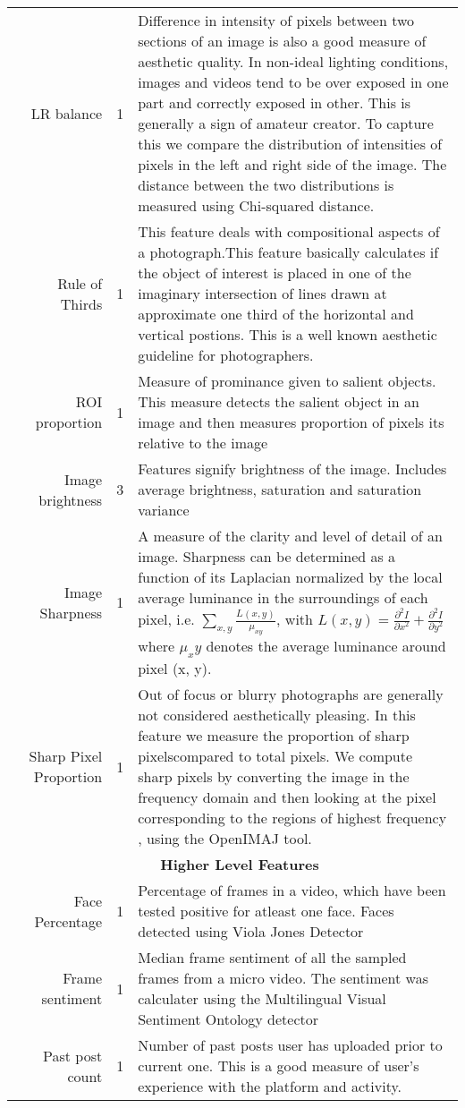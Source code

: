 \begin{table*}[t]
{\begin{tabular}{|c|r|c|p{20cm}|}
		& LR balance &1 & Difference in intensity of pixels between two sections of an image is also a good measure of aesthetic quality. In non-ideal lighting conditions, images and videos tend to be over exposed in one part and correctly exposed in other. This is generally a sign of amateur creator. To capture this we compare the distribution of intensities of pixels in the left and right side of the image. The distance between the two distributions is measured using Chi-squared distance.\\
		& Rule of Thirds & 1 & This feature deals with compositional aspects of a photograph.This feature basically calculates if the object of interest is placed in one of the imaginary intersection of lines drawn at approximate one third of the horizontal and vertical postions. This is a well known aesthetic guideline for photographers. \\
		& ROI proportion & 1 & Measure of prominance given to salient objects. This measure detects the salient object in an image and then measures proportion of pixels its relative to the image \\
		& Image brightness & 3 & Features signify brightness of the image. Includes average brightness, saturation  and saturation variance\\
		& Image Sharpness & 1 & A measure of the clarity and level of detail of an image. Sharpness can be determined as a function of its Laplacian normalized by the local average luminance in the surroundings of each pixel, i.e. $\sum_{x, y} \frac{L(x, y)}{\mu_{xy}}$, with $L(x, y) = \frac{\partial^2I}{\partial x^2}+\frac{\partial^2I}{\partial y^2}$ where $\mu_xy$ denotes the average luminance around pixel (x, y).\\
		& Sharp Pixel Proportion  & 1 & Out of focus or blurry photographs are generally not considered aesthetically pleasing. In this feature we measure the proportion of sharp pixelscompared to total pixels. We compute sharp pixels by converting the image in the frequency domain and then looking at the pixel corresponding to the regions of highest frequency \cite{yeh2010personalized}, using the OpenIMAJ \cite{Hare:2011:OIJ:2072298.2072421} tool.\\

	\cline{2-4}	
    &	\multicolumn{3}{c|}{\textbf{Higher Level Features}} \\
	\cline{2-4}
	 & Face Percentage & 1 & Percentage of frames in a video, which have been tested positive for atleast one face. Faces detected using Viola Jones Detector \cite{viola2004robust}\\
	 & Frame sentiment & 1 & Median frame sentiment of all the sampled frames from a micro video. The sentiment was calculater using the Multilingual Visual Sentiment 
	 Ontology detector \cite{jou2015visual} \\
	 & Past post count & 1 & Number of past posts user has uploaded prior to current one. This is a good measure of user's experience with the platform and activity.\\


\end{tabular}}
\end{table*}
